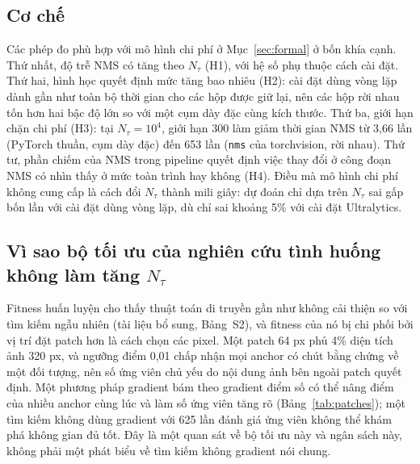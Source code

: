 \documentclass[12pt,a4paper]{article}
\newcommand{\Ntau}{N_{\tau}}
\begin{document}
\subsection{Cơ chế}
Các phép đo phù hợp với mô hình chi phí ở Mục~\ref{sec:formal} ở bốn khía cạnh. Thứ nhất, độ trễ NMS có tăng theo $\Ntau$ (H1), với hệ số phụ thuộc cách cài đặt. Thứ hai, hình học quyết định mức tăng bao nhiêu (H2): cài đặt dùng vòng lặp dành gần như toàn bộ thời gian cho các hộp được giữ lại, nên các hộp rời nhau tốn hơn hai bậc độ lớn so với một cụm dày đặc cùng kích thước. Thứ ba, giới hạn chặn chi phí (H3): tại $\Ntau=10^4$, giới hạn 300 làm giảm thời gian NMS từ 3,66 lần (PyTorch thuần, cụm dày đặc) đến 653 lần (\texttt{nms} của torchvision, rời nhau). Thứ tư, phần chiếm của NMS trong pipeline quyết định việc thay đổi ở công đoạn NMS có nhìn thấy ở mức toàn trình hay không (H4). Điều mà mô hình chi phí không cung cấp là cách đổi $\Ntau$ thành mili giây: dự đoán chỉ dựa trên $\Ntau$ sai gấp bốn lần với cài đặt dùng vòng lặp, dù chỉ sai khoảng 5\% với cài đặt Ultralytics.

\subsection{Vì sao bộ tối ưu của nghiên cứu tình huống không làm tăng $\Ntau$}
Fitness huấn luyện cho thấy thuật toán di truyền gần như không cải thiện so với tìm kiếm ngẫu nhiên (tài liệu bổ sung, Bảng~S2), và fitness của nó bị chi phối bởi vị trí đặt patch hơn là cách chọn các pixel. Một patch 64 px phủ 4\% diện tích ảnh 320 px, và ngưỡng điểm 0,01 chấp nhận mọi anchor có chút bằng chứng về một đối tượng, nên số ứng viên chủ yếu do nội dung ảnh bên ngoài patch quyết định. Một phương pháp gradient bám theo gradient điểm số có thể nâng điểm của nhiều anchor cùng lúc và làm số ứng viên tăng rõ (Bảng~\ref{tab:patches}); một tìm kiếm không dùng gradient với 625 lần đánh giá ứng viên không thể khám phá không gian đủ tốt. Đây là một quan sát về bộ tối ưu này và ngân sách này, không phải một phát biểu về tìm kiếm không gradient nói chung.
\end{document}
